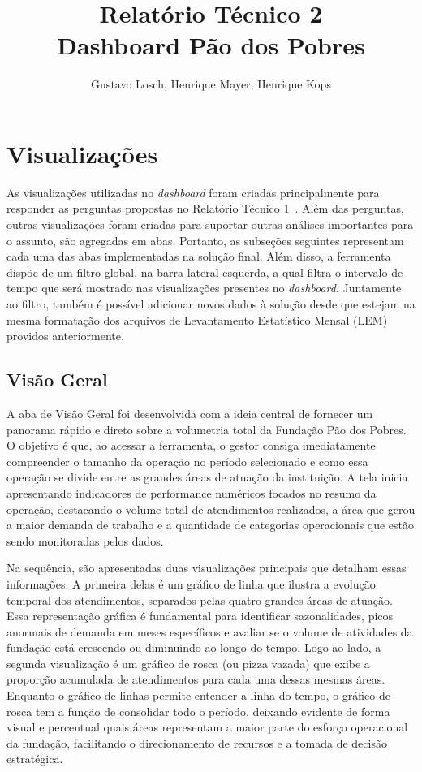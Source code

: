 \documentclass[12pt]{article}
\title{Relatório Técnico 2\\Dashboard Pão dos Pobres}
\author{Gustavo Losch\inst{1}, Henrique Mayer\inst{1}, Henrique Kops\inst{1}}
\begin{document}
 

\maketitle

\section{Visualizações}
As visualizações utilizadas no \textit{dashboard} foram criadas principalmente para responder as perguntas propostas no Relatório Técnico 1~\cite{relatorio1}. Além das perguntas, outras visualizações foram criadas para suportar outras análises importantes para o assunto, são agregadas em abas. Portanto, as subseções seguintes representam cada uma das abas implementadas na solução final. Além disso, a ferramenta dispõe de um filtro global, na barra lateral esquerda, a qual filtra o intervalo de tempo que será mostrado nas visualizações presentes no \textit{dashboard}. Juntamente ao filtro, também é possível adicionar novos dados à solução desde que estejam na mesma formatação dos arquivos de Levantamento Estatístico Mensal (LEM) providos anteriormente.

\subsection{Visão Geral}
A aba de Visão Geral foi desenvolvida com a ideia central de fornecer um panorama rápido e direto sobre a volumetria total da Fundação Pão dos Pobres. O objetivo é que, ao acessar a ferramenta, o gestor consiga imediatamente compreender o tamanho da operação no período selecionado e como essa operação se divide entre as grandes áreas de atuação da instituição. A tela inicia apresentando indicadores de performance numéricos focados no resumo da operação, destacando o volume total de atendimentos realizados, a área que gerou a maior demanda de trabalho e a quantidade de categorias operacionais que estão sendo monitoradas pelos dados.

Na sequência, são apresentadas duas visualizações principais que detalham essas informações. A primeira delas é um gráfico de linha que ilustra a evolução temporal dos atendimentos, separados pelas quatro grandes áreas de atuação. Essa representação gráfica é fundamental para identificar sazonalidades, picos anormais de demanda em meses específicos e avaliar se o volume de atividades da fundação está crescendo ou diminuindo ao longo do tempo. Logo ao lado, a segunda visualização é um gráfico de rosca (ou pizza vazada) que exibe a proporção acumulada de atendimentos para cada uma dessas mesmas áreas. Enquanto o gráfico de linhas permite entender a linha do tempo, o gráfico de rosca tem a função de consolidar todo o período, deixando evidente de forma visual e percentual quais áreas representam a maior parte do esforço operacional da fundação, facilitando o direcionamento de recursos e a tomada de decisão estratégica.
\end{document}
